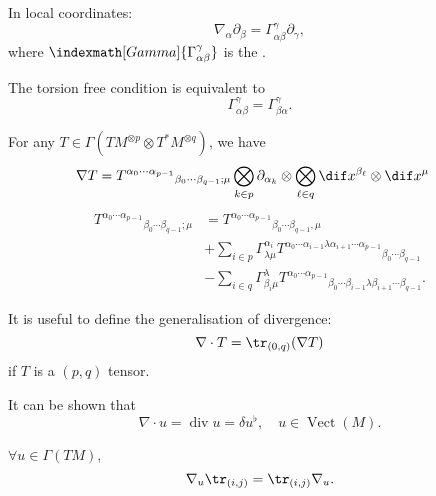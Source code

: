 \documentclass[openany, oneside, a5paper]{book}
\DeclareMathOperator{\Vect}{Vect}
\begin{document}
In local coordinates:
\begin{equation}
    \nabla_\alpha \partial_\beta = \Gamma^\gamma_{\alpha\beta} \partial_\gamma,
\end{equation}
where $\indexmath[Gamma]{\Gamma^\gamma_{\alpha\beta}}$ is the .

The torsion free condition is equivalent to
\begin{equation}\label{eq: torsion free (coordinate)}
    \Gamma^\gamma_{\alpha\beta} = \Gamma^\gamma_{\beta\alpha}.
\end{equation}

For any $T \in \Gamma(TM^{\otimes p} \otimes T^*M^{\otimes q})$, we have
\begin{align}
    \nabla T 
    &= {T^{\alpha_0 \cdots \alpha_{p - 1}}}_{\beta_0 \cdots \beta_{q - 1}; \mu} \bigotimes_{k \in p} \partial_{\alpha_k} \otimes \bigotimes_{\ell \in q} \dif x^{\beta_\ell} \otimes \dif x^\mu
\end{align}
\begin{align}
    {T^{\alpha_0 \cdots \alpha_{p - 1}}}_{\beta_0 \cdots \beta_{q - 1}; \mu} &= {T^{\alpha_0 \cdots \alpha_{p - 1}}}_{\beta_0 \cdots \beta_{q - 1}, \mu} 
    \\
    &
    + \sum_{i \in p} \Gamma^{\alpha_i}_{\lambda \mu} {T^{\alpha_0 \cdots \alpha_{i-1} \lambda \alpha_{i + 1} \cdots \alpha_{p - 1}}}_{\beta_0 \cdots \beta_{q - 1}}
    \\
    &
    - \sum_{i \in q} \Gamma^{\lambda}_{\beta_i \mu} {T^{\alpha_0 \cdots \alpha_{p - 1}}}_{\beta_0 \cdots \beta_{i-1} \lambda \beta_{i + 1} \cdots \beta_{q - 1}}.
\end{align}

It is useful to define the generalisation of divergence:
\begin{equation}
    \nabla \cdot T = \tr_{(0, q)} (\nabla T)
\end{equation}
if $T$ is a $(p, q)$ tensor.

It can be shown that
\begin{equation}
    \nabla \cdot u = \operatorname{div} u = \delta u^\flat,
    \quad
    u \in \Vect(M).
\end{equation}

\begin{theorem}
    $\forall u \in \Gamma(TM)$,
    \begin{equation}
        \nabla_u \tr_{(i, j)} = \tr_{(i, j)} \nabla_u.
    \end{equation}
\end{theorem}
\end{document}
